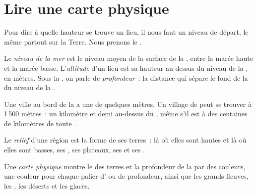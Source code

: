 \section{Lire une carte physique}

Pour dire à quelle hauteur se trouve un lieu, il nous faut un niveau de
départ, le même partout sur la Terre. Nous prenons le .

\begin{definition}\label{def:g4:world-physical-map:altitude}
Le \emph{niveau de la mer} est le niveau moyen de la
surface de la , entre la marée haute et la marée basse. L'\emph{altitude}
d'un lieu est sa hauteur au-dessus du niveau de la , en mètres. Sous la
, on parle de \emph{profondeur}~: la distance qui sépare le fond de la
 du niveau de la .
\end{definition}

Une ville au bord de la  a une  de quelques mètres. Un village
de  peut se trouver à 1\,500 mètres~: un kilomètre et demi
au-dessus du , même s'il est à des centaines de kilomètres
de toute .

\begin{definition}[Relief]\label{def:g4:world-physical-map:relief}
Le \emph{relief} d'une région est la forme de ses terres~: là
où elles sont hautes et là où elles sont basses, ses , ses
plateaux, ses  et ses .
\end{definition}

\begin{definition}\label{def:g4:world-physical-map:physical-map}
Une \emph{carte physique} montre le  des terres
et la profondeur de la  par des couleurs, une couleur pour chaque palier
d' ou de profondeur, ainsi que les grands fleuves, les , les
déserts et les glaces.
\end{definition}

